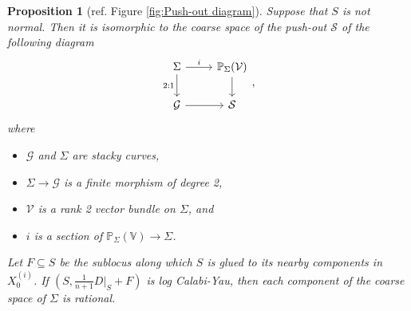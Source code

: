 \documentclass[a4paper,12pt]{amsart}
\newcommand{\bV}{{\mathbb V}}
\newcommand{\bP}{{\mathbb P}}
\newcommand{\cG}{{\mathcal{G}}}
\newcommand{\cV}{{\mathcal{V}}}
\newcommand\cS{{\mathcal{S}}}
\newtheorem{prop}[theorem]{Proposition}
\theoremstyle{definition}
\theoremstyle{remark}
\begin{document}
\begin{prop}[ref. Figure \ref{fig:Push-out diagram}]\label{prop: geometry of S3}
    Suppose that $S$ is not normal. Then it is isomorphic to the coarse space of the push-out $\cS$ of the following diagram
$$\begin{tikzcd}
\Sigma \arrow[r, "i"] \arrow[d, "2:1"'] & \mathbb{P}_{\Sigma}(\cV) \arrow[d] \\
\cG \arrow[r] & \cS
\end{tikzcd}, $$ where
\begin{itemize}
    \item $\cG$ and $\Sigma$ are stacky curves,
    \item $\Sigma\to \cG$ is a finite morphism of degree 2,
    \item $\cV$ is a rank 2 vector bundle on $\Sigma$, and
    \item $i$ is a section of $\bP_{\Sigma}(\bV)\rightarrow \Sigma$.
\end{itemize}
Let $F\subseteq S$ be the sublocus along which $S$ is glued to its nearby components in $X^{(i)}_0$. If $(S,\frac{1}{n+1}D|_S+F)$ is log Calabi-Yau, then each component of the coarse space of $\Sigma$ is rational.
\end{prop}
\end{document}
